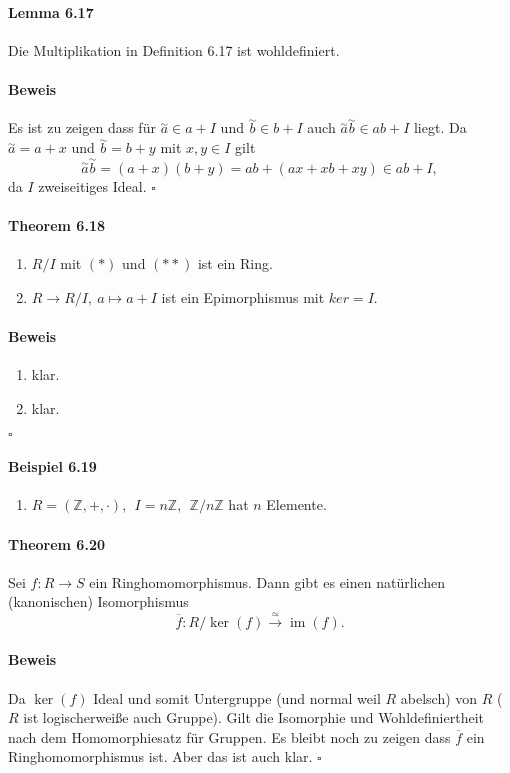 \documentclass{scrartcl}
\newcommand{\s}[1]{\overset{\sim}{#1}} %
\newcommand{\q}[1]{\overline{#1}} %
\newcommand{\im}{\operatorname{im}}
\begin{document}
\paragraph{Lemma 6.17}
Die Multiplikation in Definition 6.17 ist wohldefiniert.
\paragraph{Beweis}
Es ist zu zeigen dass für $\s{a} \in a + I$ und $\s{b} \in b + I$ auch
$\s{a}\s{b} \in ab + I$ liegt. Da $\s{a} = a + x$ und $\s{b} = b + y$ mit $x,y
\in I$ gilt
\[
  \s{a}\s{b} = (a + x)(b + y) = ab + (ax + xb + xy) \in ab + I,
\]
da $I$ zweiseitiges Ideal.
\hfill $\square$

\paragraph{Theorem 6.18}
\begin{enumerate}
\item $R/I$ mit $(*)$ und $(**)$ ist ein Ring.
\item $R \to R/I,~a \mapsto a + I$ ist ein Epimorphismus mit $ker = I$.
\end{enumerate}
\paragraph{Beweis}
\begin{enumerate}{}
\item klar.
\item klar.
\end{enumerate}
\hfill $\square$

\paragraph{Beispiel 6.19}
\begin{enumerate}
\item $R = (\mathbb{Z}, +, \cdot),~~ I = n\mathbb{Z},~~ \mathbb{Z}/n\mathbb{Z}$
  hat $n$ Elemente.
\end{enumerate}

\paragraph{Theorem 6.20}
Sei $f: R \to S$ ein Ringhomomorphismus. Dann gibt es einen natürlichen
(kanonischen) Isomorphismus
\[
  \overline{f}: R/\ker(f) \overset{\simeq}{\longrightarrow} \im(f).
\]
\paragraph{Beweis}
Da $\ker(f)$ Ideal und somit Untergruppe (und normal weil $R$ abelsch) von $R$ ($R$ ist logischerweiße auch
Gruppe). Gilt die Isomorphie und Wohldefiniertheit nach dem Homomorphiesatz für Gruppen. Es bleibt
noch zu zeigen dass $\q{f}$ ein Ringhomomorphismus ist. Aber das ist auch klar.
\hfill $\square$
\end{document}
